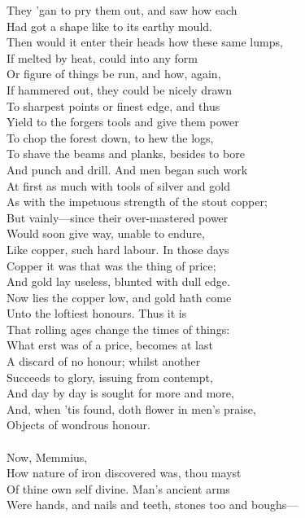 They 'gan to pry them out, and saw how each\\
Had got a shape like to its earthy mould.\\
Then would it enter their heads how these same lumps,\\
If melted by heat, could into any form\\
Or figure of things be run, and how, again,\\
If hammered out, they could be nicely drawn\\
To sharpest points or finest edge, and thus\\
Yield to the forgers tools and give them power\\
To chop the forest down, to hew the logs,\\
To shave the beams and planks, besides to bore\\
And punch and drill. And men began such work\\
At first as much with tools of silver and gold\\
As with the impetuous strength of the stout copper;\\
But vainly—since their over-mastered power\\
Would soon give way, unable to endure,\\
Like copper, such hard labour. In those days\\
Copper it was that was the thing of price;\\
And gold lay useless, blunted with dull edge.\\
Now lies the copper low, and gold hath come\\
Unto the loftiest honours. Thus it is\\
That rolling ages change the times of things:\\
What erst was of a price, becomes at last\\
A discard of no honour; whilst another\\
Succeeds to glory, issuing from contempt,\\
And day by day is sought for more and more,\\
And, when 'tis found, doth flower in men's praise,\\
Objects of wondrous honour.\\
\\
Now, Memmius,\\
How nature of iron discovered was, thou mayst\\
Of thine own self divine. Man's ancient arms\\
Were hands, and nails and teeth, stones too and boughs—\\
